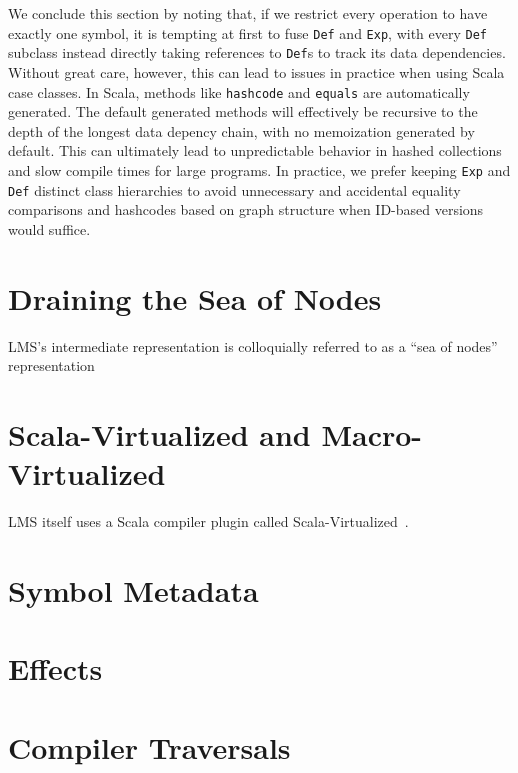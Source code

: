 We conclude this section by noting that, if we restrict every operation to have exactly one symbol,
it is tempting at first to fuse \texttt{Def} and \texttt{Exp}, with every
\texttt{Def} subclass instead directly taking references to \texttt{Def}s to
track its data dependencies.
Without great care, however, this can lead to
issues in practice when using Scala case classes. In Scala, methods like
\texttt{hashcode} and \texttt{equals} are automatically generated.
The default generated methods will effectively be recursive to the depth of the longest data depency chain, with no memoization generated by default.
This can ultimately lead to unpredictable behavior in hashed collections and
slow compile times for large programs. In practice, we prefer keeping
\texttt{Exp} and \texttt{Def} distinct class hierarchies to avoid unnecessary
and accidental equality comparisons and hashcodes based on graph structure when ID-based versions would suffice.



\section{Draining the Sea of Nodes}
LMS's intermediate representation is colloquially referred to as
a ``sea of nodes'' representation



\section{Scala-Virtualized and Macro-Virtualized}
LMS itself uses a Scala compiler plugin called
Scala-Virtualized~\cite{scala-virtualized}.

\cite{cedric-thesis, boris-thesis}

\section{Symbol Metadata}

\section{Effects}

\section{Compiler Traversals}
